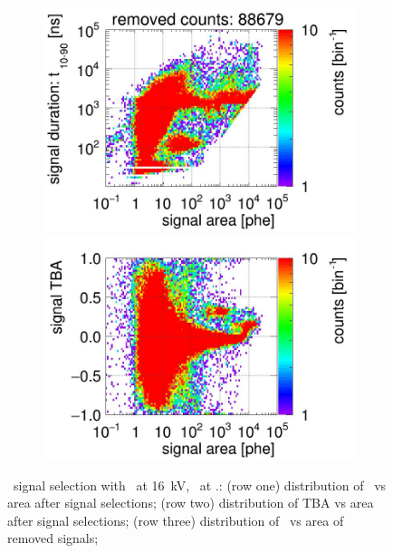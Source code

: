 \begin{landscape}
\begin{figure}[!p]
\begin{subfigure}[t]{0.33\textwidth}
			\includegraphics[width=\figurewidth,clip,trim={0 98 0 10}]{Figures/GasTest/CutsValid/res64771/pdpaX29Vecfig64771.jpg}
			\includegraphics[width=\figurewidth,clip,trim={0 0 0 40}]{Figures/GasTest/CutsValid/res64771/tbapaX29Vecfig64771.jpg}
			\caption{}
			\label{fig:signal selection dv 16 04}
		\end{subfigure}
		\caption[\gtest\ signal selection with \opdv\ at \SI{16}{\kV}, \opgd\ at \standarddensity .]{\gtest\ signal selection with \opdv\ at \SI{16}{\kV}, \opgd\ at \standarddensity .: 
			(row one) distribution of \rpdshort\ vs area after signal selections;
			(row two) distribution of TBA vs area after signal selections;
			(row three) distribution of \rpdshort\ vs area of removed signals;
}
\end{figure}
\end{landscape}
